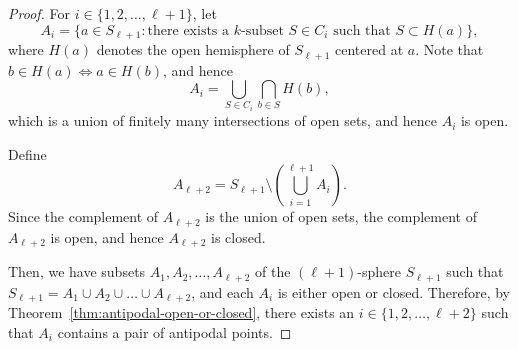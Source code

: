 \begin{proof}
    For \(i \in \{1, 2, \dots, \ell + 1\}\), let
    \begin{equation}
        A_i = \{
            a \in S_{\ell + 1}
            :
            \text{there exists a \(k\)-subset } S \in C_i
            \text{ such that } S \subset H(a)
        \},
    \end{equation}
    where \(H(a)\) denotes
    the open hemisphere of \(S_{\ell + 1}\) centered at \(a\).
    Note that \(b \in H(a) \iff a \in H(b)\), and hence
    \begin{equation}
        A_i = \bigcup_{S \in C_i} \bigcap_{b \in S} H(b),
    \end{equation}
    which is a union of finitely many intersections of open sets,
    and hence \(A_i\) is open.

    Define 
    \begin{equation}
        A_{\ell + 2} =
        S_{\ell + 1} \setminus \left( \bigcup_{i = 1}^{\ell + 1} A_i \right).
    \end{equation}
    Since the complement of \(A_{\ell + 2}\) is the union of open sets, 
    the complement of \(A_{\ell + 2}\) is open,
    and hence \(A_{\ell + 2}\) is closed.

    Then, we have
    subsets \(A_1, A_2, \dots, A_{\ell + 2}\)
    of the \((\ell + 1)\)-sphere \(S_{\ell + 1}\)
    such that \( S_{\ell + 1} = A_1 \cup A_2 \cup \dots \cup A_{\ell + 2} \),
    and each \(A_i\) is either open or closed.
    Therefore, by Theorem~\ref{thm:antipodal-open-or-closed},
    there exists an \(i \in \{1, 2, \dots, \ell + 2\}\)
    such that \(A_i\) contains a pair of antipodal points.


\end{proof}
